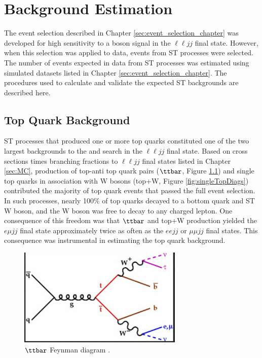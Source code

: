 \chapter{Background Estimation}
\label{sec:backgroundEstimation}
The event selection described in Chapter \ref{sec:event_selection_chapter} was developed for high 
sensitivity to a \WR boson signal in the $\ell\ell jj$ final state.  However, when this selection 
was applied to data, events from ST processes were selected.  The number of events 
expected in data from ST processes was estimated using simulated \MC datasets listed in Chapter \ref{sec:event_selection_chapter}.  
The procedures used to calculate and validate the expected ST backgrounds are described here.

\section{Top Quark Background}
\label{sec:topQrkBkgnds}
ST processes that produced one or more top quarks constituted one of the two largest backgrounds 
to the \WR and \nul search in the $\ell\ell jj$ final state.  Based on cross sections times branching 
fractions to $\ell\ell jj$ final states listed in Chapter \ref{sec:MC}, production 
of top-anti top quark pairs ($\ttbar$, Figure \ref{fig:ttbarDiag}) and single top quarks in association 
with W bosons (top+W, Figure \ref{fig:singleTopDiags}) contributed the majority of top quark events that passed 
the full event selection.  In such processes, nearly 100\% of top quarks decayed to a bottom quark 
and ST W boson, and the W boson was free to decay to any charged lepton.  One consequence of this freedom 
was that $\ttbar$ and top+W production yielded the $e\mu jj$ final state approximately twice as often 
as the $eejj$ or $\mu\mu jj$ final states.  This consequence was instrumental in estimating the top quark 
background.

\begin{figure}[h]
	\centering
	\includegraphics[width=0.7\textwidth]{figures/topAntiTopFeynDiagram.png}
	\caption{$\ttbar$ Feynman diagram \cite{ttbarDiagram}.}
	\label{fig:ttbarDiag}
\end{figure}

